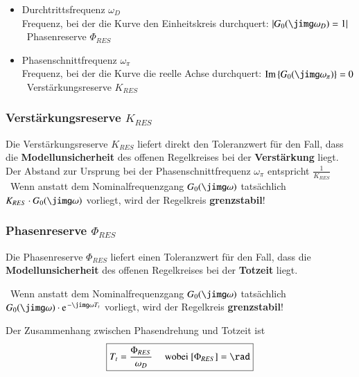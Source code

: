 \begin{itemize}
    \item Durchtrittsfrequenz $\omega_{D}$ \\
        Frequenz, bei der die Kurve den Einheitskreis durchquert: $| G_{0}(\jimg \omega_{D}) = 1 |$ \\
        \textrightarrow\ Phasenreserve $\Phi_{RES}$
    
    \item Phasenschnittfrequenz $\omega_{\pi}$ \\
        Frequenz, bei der die Kurve die reelle Achse durchquert: $\Im{G_{0}(\jimg \omega_{\pi})} = 0$\\
        \textrightarrow\ Verstärkungsreserve $K_{RES}$
\end{itemize}


\subsubsection{Verstärkungsreserve $K_{RES}$}

Die Verstärkungsreserve $K_{RES}$ liefert direkt den Toleranzwert für den Fall, dass die \textbf{Modellunsicherheit} des 
offenen Regelkreises bei der \textbf{Verstärkung} liegt. \\
Der Abstand zur Ursprung bei der Phasenschnittfrequenz $\omega_{\pi}$ entspricht $\frac{1}{K_{RES}}$ \\
\textrightarrow\ Wenn anstatt dem Nominalfrequenzgang $G_0(\jimg \omega)$ tatsächlich $K_{RES} \cdot G_0(\jimg \omega)$ vorliegt, wird der
Regelkreis \textbf{grenzstabil}!


\subsubsection{Phasenreserve $\Phi_{RES}$}

Die Phasenreserve $\Phi_{RES}$ liefert einen Toleranzwert für den Fall, dass die \\
\textbf{Modellunsicherheit} des offenen Regelkreises bei der \textbf{Totzeit} liegt.

\textrightarrow\ Wenn anstatt dem Nominalfrequenzgang $G_0(\jimg \omega)$ tatsächlich $G_0(\jimg \omega) \cdot \e^{- \jimg \omega T_t}$ vorliegt, 
wird der Regelkreis \textbf{grenzstabil}!
\bigskip

Der Zusammenhang zwischen Phasendrehung und Totzeit ist
$$ \boxed{ T_t = \frac{\Phi_{RES}}{\omega_D}  \quad \text{ wobei } [\Phi_{RES}] = \rad } $$



